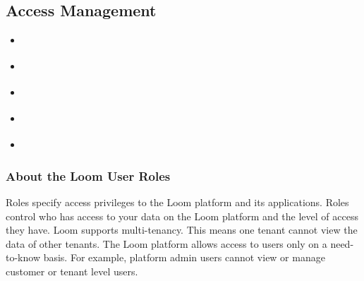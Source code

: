 \documentclass[letterpaper,10pt,english]{sphinxmanual}
\begin{document}
\subsection{Access Management}
\label{\detokenize{loom_getting_started_guide:access-management}}\label{\detokenize{loom_getting_started_guide:content-user-mngt}}
\begin{sphinxShadowBox}
\begin{itemize}
\item {} 
\label{\detokenize{loom_getting_started_guide:id103}}{\hyperref[\detokenize{loom_getting_started_guide:about-the-loom-user-roles}]{}}

\item {} 
\label{\detokenize{loom_getting_started_guide:id104}}{\hyperref[\detokenize{loom_getting_started_guide:role-privileges-of-loom-users}]{}}

\item {} 
\label{\detokenize{loom_getting_started_guide:id105}}{\hyperref[\detokenize{loom_getting_started_guide:granting-access-to-loom-users}]{}}

\item {} 
\label{\detokenize{loom_getting_started_guide:id106}}{\hyperref[\detokenize{loom_getting_started_guide:adding-a-customer-account}]{}}

\item {} 
\label{\detokenize{loom_getting_started_guide:id107}}{\hyperref[\detokenize{loom_getting_started_guide:loom-tenant-management}]{}}

\end{itemize}
\end{sphinxShadowBox}


\subsubsection{About the Loom User Roles}
\label{\detokenize{loom_getting_started_guide:about-the-loom-user-roles}}
Roles specify access privileges to the Loom platform and its applications. Roles control who has access to your data on the Loom platform and the level of access they have. Loom supports multi-tenancy. This means one tenant cannot view the data of other tenants. The Loom platform allows access to users only on a need-to-know basis. For example, platform admin users cannot view or manage customer or tenant level users.
\end{document}
